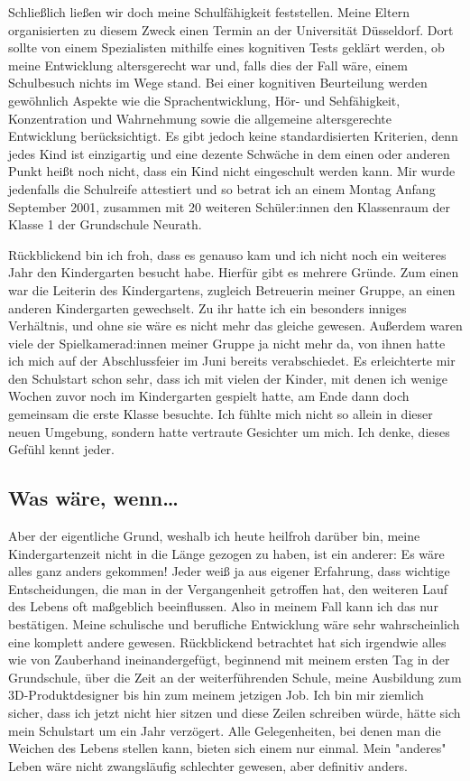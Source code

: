 \documentclass[fontsize=14pt,a4paper,headinclude,DIV=calc,automark]{scrbook}
\begin{document}
Schließlich ließen wir doch meine Schulfähigkeit feststellen. Meine Eltern organisierten zu diesem Zweck einen Termin an der Universität Düsseldorf. Dort sollte von einem Spezialisten mithilfe eines kognitiven Tests geklärt werden, ob meine Entwicklung altersgerecht war und, falls dies der Fall wäre, einem Schulbesuch nichts im Wege stand. Bei einer kognitiven Beurteilung werden gewöhnlich Aspekte wie die Sprachentwicklung, Hör- und Sehfähigkeit, Konzentration und Wahrnehmung sowie die allgemeine altersgerechte Entwicklung berücksichtigt. Es gibt jedoch keine standardisierten Kriterien, denn jedes Kind ist einzigartig und eine dezente Schwäche in dem einen oder anderen Punkt heißt noch nicht, dass ein Kind nicht eingeschult werden kann. Mir wurde jedenfalls die Schulreife attestiert und so betrat ich an einem Montag Anfang September 2001, zusammen mit 20 weiteren Schüler:innen den Klassenraum der Klasse 1 der Grundschule Neurath.

Rückblickend bin ich froh, dass es genauso kam und ich nicht noch ein weiteres Jahr den Kindergarten besucht habe. Hierfür gibt es mehrere Gründe. Zum einen war die Leiterin des Kindergartens, zugleich Betreuerin meiner Gruppe, an einen anderen Kindergarten gewechselt. Zu ihr hatte ich ein besonders inniges Verhältnis, und ohne sie wäre es nicht mehr das gleiche gewesen. Außerdem waren viele der Spielkamerad:innen meiner Gruppe ja nicht mehr da, von ihnen hatte ich mich auf der Abschlussfeier im Juni bereits verabschiedet. Es erleichterte mir den Schulstart schon sehr, dass ich mit vielen der Kinder, mit denen ich wenige Wochen zuvor noch im Kindergarten gespielt hatte, am Ende dann doch gemeinsam die erste Klasse besuchte. Ich fühlte mich nicht so allein in dieser neuen Umgebung, sondern hatte vertraute Gesichter um mich. Ich denke, dieses Gefühl kennt jeder.

\subsection{Was wäre, wenn…}

Aber der eigentliche Grund, weshalb ich heute heilfroh darüber bin, meine Kindergartenzeit nicht in die Länge gezogen zu haben, ist ein anderer: Es wäre alles ganz anders gekommen! Jeder weiß ja aus eigener Erfahrung, dass wichtige Entscheidungen, die man in der Vergangenheit getroffen hat, den weiteren Lauf des Lebens oft maßgeblich beeinflussen. Also in meinem Fall kann ich das nur bestätigen. Meine schulische und berufliche Entwicklung wäre sehr wahrscheinlich eine komplett andere gewesen. Rückblickend betrachtet hat sich irgendwie alles wie von Zauberhand ineinandergefügt, beginnend mit meinem ersten Tag in der Grundschule, über die Zeit an der weiterführenden Schule, meine Ausbildung zum 3D-Produktdesigner bis hin zum meinem jetzigen Job. Ich bin mir ziemlich sicher, dass ich jetzt nicht hier sitzen und diese Zeilen schreiben würde, hätte sich mein Schulstart um ein Jahr verzögert. Alle Gelegenheiten, bei denen man die Weichen des Lebens stellen kann, bieten sich einem nur einmal. Mein "anderes" Leben wäre nicht zwangsläufig schlechter gewesen, aber definitiv anders.
\end{document}
